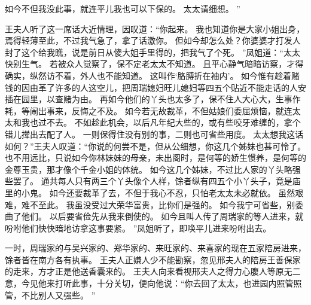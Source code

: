 如今不但我没此事，就连平儿我也可以下保的。
太太请细想。
”\par
王夫人听了这一席话大近情理，因叹道：“你起来。
我也知道你是大家小姐出身，焉得轻薄至此，不过我气急了，拿了话激你。
但如今却怎么处？你婆婆才打发人封了这个给我瞧，说是前日从傻大姐手里得的，把我气了个死。
”凤姐道：“太太快别生气。
若被众人觉察了，保不定老太太不知道。
且平心静气暗暗访察，才得确实，纵然访不着，外人也不能知道。
这叫作‘胳膊折在袖内’。
如今惟有趁着赌钱的因由革了许多的人这空儿，把周瑞媳妇旺儿媳妇等四五个贴近不能走话的人安插在园里，以查赌为由。
再如今他们的丫头也太多了，保不住人大心大，生事作耗，等闹出事来，反悔之不及。
如今若无故裁革，不但姑娘们委屈烦恼，就连太太和我也过不去。
不如趁此机会，以后凡年纪大些的，或有些咬牙难缠的，拿个错儿撵出去配了人。
一则保得住没有别的事，二则也可省些用度。
太太想我这话如何？”王夫人叹道：“你说的何尝不是，但从公细想，你这几个姊妹也甚可怜了。
也不用远比，只说如今你林妹妹的母亲，未出阁时，是何等的娇生惯养，是何等的金尊玉贵，那才像个千金小姐的体统。
如今这几个姊妹，不过比人家的丫头略强些罢了。
通共每人只有两三个丫头像个人样，馀者纵有四五个小丫头子，竟是庙里的小鬼。
如今还要裁革了去，不但于我心不忍，只怕老太太未必就依。
虽然艰难，难不至此。
我虽没受过大荣华富贵，比你们是强的。
如今我宁可省些，别委曲了他们。
以后要省俭先从我来倒使的。
如今且叫人传了周瑞家的等人进来，就吩咐他们快快暗地访拿这事要紧。
”凤姐听了，即唤平儿进来吩咐出去。
\par
一时，周瑞家的与吴兴家的、郑华家的、来旺家的、来喜家的现在五家陪房进来，馀者皆在南方各有执事。
王夫人正嫌人少不能勘察，忽见邢夫人的陪房王善保家的走来，方才正是他送香囊来的。
王夫人向来看视邢夫人之得力心腹人等原无二意，今见他来打听此事，十分关切，便向他说：“你去回了太太，也进园内照管照管，不比别人又强些。
”\par
